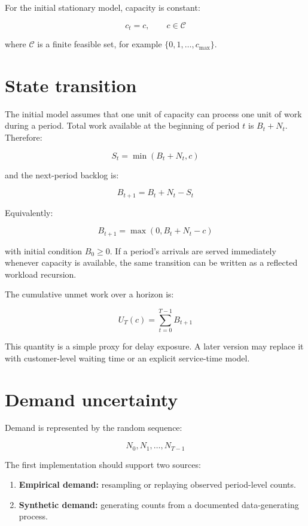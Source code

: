 \documentclass[11pt,a4paper]{article}
\newcommand{\equationnote}[1]{\begin{center}\colorbox{boxblue}{\parbox{0.92\linewidth}{\begin{equation*}#1\end{equation*}}}\end{center}}
\begin{document}
For the initial stationary model, capacity is constant:

\equationnote{c_t = c, \qquad c \in \mathcal{C}}

where $\mathcal{C}$ is a finite feasible set, for example $\{0,1,\ldots,c_{\max}\}$.

\section{State transition}

The initial model assumes that one unit of capacity can process one unit of work during a period. Total work available at the beginning of period $t$ is $B_t + N_t$. Therefore:

\equationnote{S_t = \min(B_t + N_t, c)}

and the next-period backlog is:

\equationnote{B_{t+1} = B_t + N_t - S_t}

Equivalently:

\equationnote{B_{t+1} = \max(0, B_t + N_t - c)}

with initial condition $B_0 \geq 0$. If a period's arrivals are served immediately whenever capacity is available, the same transition can be written as a reflected workload recursion.

The cumulative unmet work over a horizon is:

\equationnote{U_T(c) = \sum_{t=0}^{T-1} B_{t+1}}

This quantity is a simple proxy for delay exposure. A later version may replace it with customer-level waiting time or an explicit service-time model.

\section{Demand uncertainty}

Demand is represented by the random sequence:

\equationnote{N_0, N_1, \ldots, N_{T-1}}

The first implementation should support two sources:
\begin{enumerate}
  \item \textbf{Empirical demand:} resampling or replaying observed period-level counts.
  \item \textbf{Synthetic demand:} generating counts from a documented data-generating process.
\end{enumerate}
\end{document}
